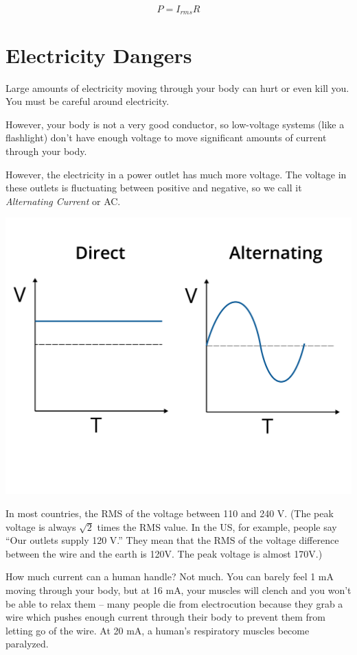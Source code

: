 $$P = I_{rms} R$$

\section{Electricity Dangers}

Large amounts of electricity moving through your body can hurt or even kill
you. You must be careful around electricity.

However, your body is not a very good conductor, so low-voltage
systems (like a flashlight) don't have enough voltage to move significant amounts of
current through your body.

However, the  electricity in a power outlet has much more voltage. The voltage
in these outlets is fluctuating between positive and negative, so we
call it \textit{Alternating Current} or AC.

\includegraphics[width=1\textwidth]{AC_vs_DC.png}

In most countries, the RMS of the voltage between 110 and 240 V. (The
peak voltage is always $\sqrt{2}$ times the RMS value. In the US, for
example, people say ``Our outlets supply 120 V.'' They mean that the
RMS of the voltage difference between the wire and the earth is 120V.
The peak voltage is almost 170V.)

How much current can a human handle? Not much. You can barely feel 1
mA moving through your body, but at 16 mA, your muscles will clench
and you won't be able to relax them -- many people die from
electrocution because they grab a wire which pushes enough current
through their body to prevent them from letting go of the wire.  At 20
mA, a human's respiratory muscles become paralyzed.

